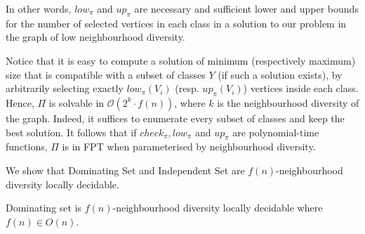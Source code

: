   In other words, $low_\pi$ and $up_\pi$ are necessary and sufficient lower and upper bounds for the number of selected vertices in each class in a solution to our problem in the graph of low neighbourhood diversity.

Notice that it is easy to compute a solution of minimum (respectively maximum) size that is compatible with a subset of classes $Y$ (if such a solution exists), by arbitrarily selecting exactly $low_\pi(V_i)$ (resp. $up_\pi(V_i)$) vertices inside each class.
%
Hence, $\Pi$ is solvable in $\mathcal{O}(2^k \cdot f(n))$, where $k$ is the neighbourhood diversity of the graph. Indeed, it suffices to enumerate every subset of classes and keep the best solution. It follows that if $check_\pi, low_\pi$ and $up_\pi$ are polynomial-time functions, $\Pi$ is in FPT when parameterised by neighbourhood diversity.


We show that {\sc Dominating Set} and {\sc Independent Set} are $f(n)$-neighbourhood diversity locally decidable.

\begin{lemmarep}
  \label{lemma:ds is ndld} {\sc Dominating set} is $f(n)$-neighbourhood diversity locally decidable where $f(n) \in O(n)$.
\end{lemmarep}

